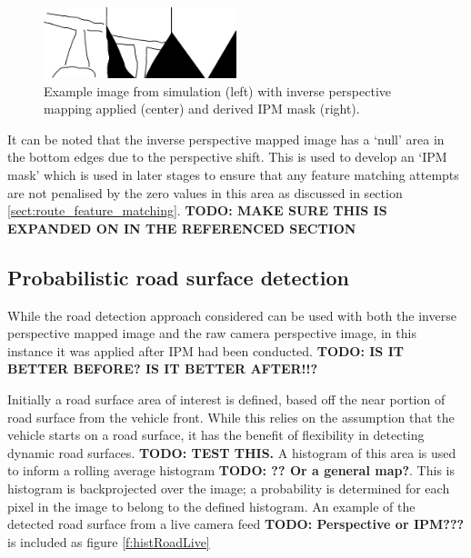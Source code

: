 \documentclass[]{aiaa-tc}%
\begin{document}
\begin{figure} %
	\centering
	\includegraphics[width=0.5\textwidth, height=0.5\textwidth]{RoadDetection/ipmSim.png}
	\caption{Example image from simulation (left) with inverse perspective mapping applied (center) and derived IPM mask (right).}
	\label{f:ipmSim}
\end{figure}

It can be noted that the inverse perspective mapped image has a `null' area in the bottom edges due to the perspective shift. This is used to develop an `IPM mask' which is used in later stages to ensure that any feature matching attempts are not penalised by the zero values in this area as discussed in section \ref{sect:route_feature_matching}. \textbf{TODO: MAKE SURE THIS IS EXPANDED ON IN THE REFERENCED SECTION}

\subsection{Probabilistic road surface detection}

While the road detection approach considered can be used with both the inverse perspective mapped image and the raw camera perspective image, in this instance it was applied after IPM had been conducted. \textbf{TODO: IS IT BETTER BEFORE? IS IT BETTER AFTER!!?}

Initially a road surface area of interest is defined, based off the near portion of road surface from the vehicle front. While this relies on the assumption that the vehicle starts on a road surface, it has the benefit of flexibility in detecting dynamic road surfaces. \textbf{TODO: TEST THIS.} A histogram of this area is used to inform a rolling average histogram \textbf{TODO: ?? Or a general map?}. This is histogram is backprojected over the image; a probability is determined for each pixel in the image to belong to the defined histogram. An example of the detected road surface from a live camera feed \textbf{TODO: Perspective or IPM???} is included as figure \ref{f:histRoadLive}
\end{document}
